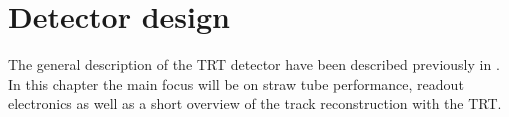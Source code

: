 \section{Detector design}
\label{sec:trt_straw_hw}

The general description of the TRT detector have been described previously in .
In this chapter the main focus will be on straw tube performance, readout electronics as well as a short overview of the track reconstruction with the TRT.






